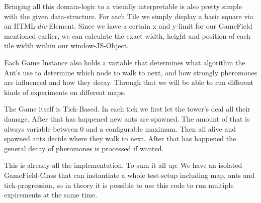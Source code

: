 Bringing all this domain-logic to a visually interpretable is also pretty simple with the given data-structure. For each Tile we simply display a basic square via an HTML-\textit{div}-Element. Since we have a certain x and y-limit for our GameField mentioned earlier, we can calculate the exact width, height and position of each tile width within our window-JS-Object\cite[P. 570]{goodman2002dynamic}.

Each Game Instance also holds a variable that determines what algorithm the Ant's use to determine which node to walk to next, and how strongly pheromones are influenced and how they decay. Through that we will be able to run different kinds of experiments on different maps.

The Game itself is Tick-Based. In each tick we first let the tower's deal all their damage. After that has happened new ants are spawned. The amount of that is always variable between 0 and a configurable maximum. Then all alive and spawned ants decide where they walk to next. After that has happened the general decay of pheromones is processed if wanted.

This is already all the implementation. To sum it all up: We have an isolated GameField-Class that can instantiate a whole test-setup including map, ants and tick-progression, so in theory it is possible to use this code to run multiple expirements at the same time.